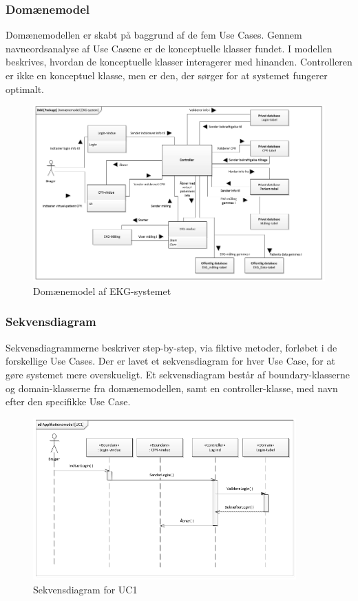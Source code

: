 \subsubsection{Domænemodel}
Domænemodellen er skabt på baggrund af de fem Use Cases. Gennem navneordsanalyse af Use Casene er de konceptuelle klasser fundet. I modellen beskrives, hvordan de konceptuelle klasser interagerer med hinanden. Controlleren er ikke en konceptuel klasse, men er den, der sørger for at systemet fungerer optimalt.

\begin{figure}[H]
	\centering
	\includegraphics[width=1\textwidth]{Figurer/Snip20150525_18}
	\caption{Domænemodel af EKG-systemet}
\end{figure}

\subsubsection{Sekvensdiagram}
Sekvensdiagrammerne beskriver step-by-step, via fiktive metoder, forløbet i de forskellige Use Cases. Der er lavet et sekvensdiagram for hver Use Case, for at gøre systemet mere overskueligt. Et sekvensdiagram består af boundary-klasserne og domain-klasserne fra domænemodellen, samt en controller-klasse, med navn efter den specifikke Use Case.  

\begin{figure}[H]
	\centering
	\includegraphics[width=0.9\textwidth]{Figurer/Snip20150429_34}
	\caption{Sekvensdiagram for UC1}
\end{figure}

